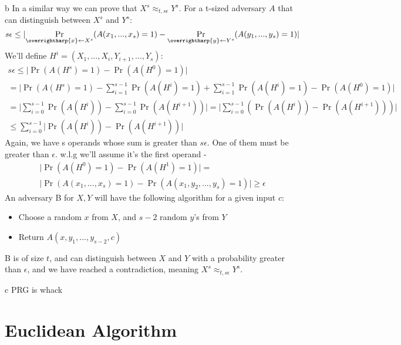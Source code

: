 \documentclass{article}
\begin{document}
\begin{paragraph}
	b In a similar way we can prove that ${X^s \approx_{t, s\epsilon} Y^s}$. For a t-sized adversary ${A}$ that can distinguish between
	${X^s}$ and ${Y^s}$:
	\begin{equation*}
		s\epsilon \leq \lvert \Pr_{\overrightharp{x} \leftarrow X^s}(A(x_1, ... , x_s) = 1) - \Pr_{\overrightharp{y} \leftarrow Y^s}(A(y_1, ... , y_s) = 1) \rvert
	\end{equation*}
	We'll define ${H^i = (X_1,...,X_i,Y_{i+1},...,Y_s)}$:
	\begin{gather*}
		s\epsilon \leq \lvert \Pr(A(H^s) = 1) - \Pr(A(H^0) = 1) \rvert \\
		= \lvert \Pr(A(H^s) = 1) - \sum_{i = 1}^{s - 1} \Pr(A(H^i) = 1) + \sum_{i = 1}^{s - 1} \Pr(A(H^i) = 1) - \Pr(A(H^0) = 1) \rvert \\
		= \lvert \sum_{i = 0}^{s-1} \Pr(A(H^i)) - \sum_{i = 0}^{s-1} \Pr(A(H^{i+1})) \rvert
		= \lvert \sum_{i = 0}^{s-1} (\Pr(A(H^i)) - \Pr(A(H^{i+1}))) \rvert \\
		\leq \sum_{i = 0}^{s-1} {\lvert \Pr(A(H^i)) - \Pr(A(H^{i+1})) \rvert }
	\end{gather*}
	Again, we have s operands whose sum is greater than ${s\epsilon}$. One of them must be greater than ${\epsilon}$.
	w.l.g we'll assume it's the first operand -
	\begin{gather*}
		\lvert \Pr(A(H^0) = 1) - \Pr(A(H^1) = 1) \rvert = \\
		\lvert \Pr(A(x_1, ... , x_s) = 1) - \Pr(A(x_1, y_2, ... , y_s) = 1) \rvert \geq \epsilon
	\end{gather*}
	An adversary B for ${X, Y}$ will have the following algorithm for a given input ${c}$:
	\begin{itemize}
		\item Choose a random ${x}$ from ${X}$, and ${s-2}$ random ${y}$'s from ${Y}$
		\item Return ${A(x, y_1,..., y_{s-2}, c)}$
	\end{itemize}
	B is of size ${t}$, and can distinguish between ${X}$ and ${Y}$ with a probability greater than ${\epsilon}$,
	and we have reached a contradiction, meaning ${X^s \approx_{t, s\epsilon} Y^s}$.
\end{paragraph}

\begin{paragraph}
	c PRG is whack
\end{paragraph}

\section{Euclidean Algorithm}
\end{document}
